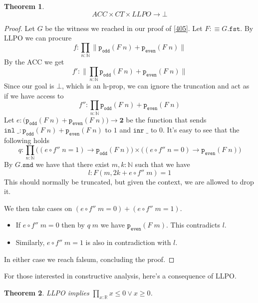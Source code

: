 \documentclass[12pt]{report}
\newtheorem{thm}{Theorem}[section]
\begin{document}
\begin{thm}
$$ACC \times CT \times LLPO \rightarrow \bot$$
\end{thm}
\begin{proof}
Let $G$ be the witness we reached in our proof of \cref{405}. 
Let $F :\equiv G.\mathtt{fst}$. 
By LLPO we can procure 
$$f : \prod_{n : \mathbb{N}} \lVert \mathtt{p_{odd}}(F\; n) + \mathtt{p_{even}}(F\;n) \rVert$$
By the ACC we get
$$f' : \big\lVert \prod_{n : \mathbb{N}}  \mathtt{p_{odd}}(F\; n) + \mathtt{p_{even}}(F\;n) \big\rVert$$
Since our goal is $\bot$, which is an h-prop, we can ignore the truncation and act as if we have access to
$$f'' : \prod_{n : \mathbb{N}}  \mathtt{p_{odd}}(F\; n) + \mathtt{p_{even}}(F\;n)$$
Let $e : \big( \mathtt{p_{odd}}(F\; n) + \mathtt{p_{even}}(F\;n)\big) \rightarrow \mathbf{2}$ be the function that sends $\mathtt{inl}\; \_ : \mathtt{p_{odd}}(F\; n) + \mathtt{p_{even}}(F\;n)$
to $1$ and $\mathtt{inr}\; \_$ to $0$. 
It's easy to see that the following holds
$$q : \prod_{n : \mathbb{N}} \big( (e\circ f''\; n = 1) \rightarrow \mathtt{p_{odd}}(F\; n) \big) \times \big( (e\circ f''\; n = 0) \rightarrow \mathtt{p_{even}}(F\; n) \big)$$
By $G.\mathtt{snd}$ we have that there exist $m,k : \mathbb{N}$ such that we have 
$$l : F(m, 2k + e\circ f''\; m) = 1$$
This should normally be truncated, but given the context, we are allowed to drop it. 

We then take cases on $(e\circ f''\; m = 0) + (e\circ f''\; m = 1)$. 
\begin{itemize}
	\item If $e\circ f''\; m = 0$ then by $q\; m$ we have $\mathtt{p_{even}}(F\; m)$. 
	This contradicts $l$. 
	\item Similarly, $e\circ f''\; m = 1$ is also in contradiction with $l$.
\end{itemize}
In either case we reach falsum, concluding the proof.
\end{proof}
For those interested in constructive analysis, here's a consequence of LLPO. 
\begin{thm}
LLPO implies $\prod_{x : \mathbb{R}}x \leq 0 \vee x \geq 0$.
\end{thm}
\end{document}
